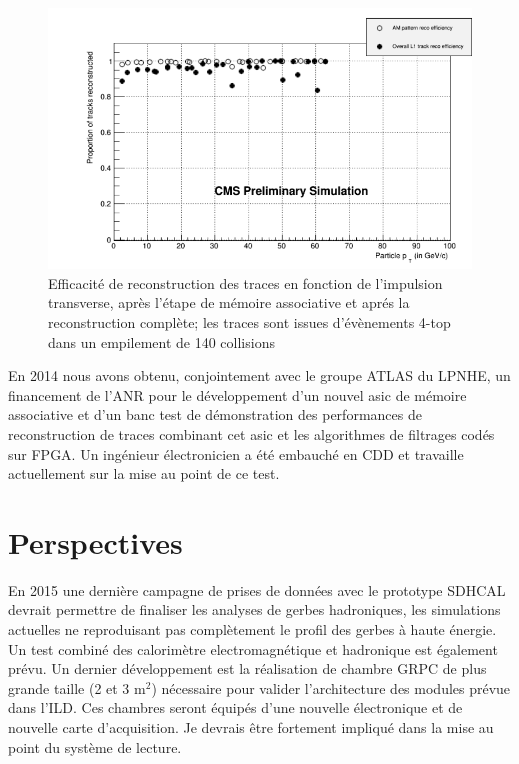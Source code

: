 \documentclass[11pt,french]{article}
\begin{document}
\begin{figure}
\centerline{{\includegraphics[height=0.4\textheight]{./TrackEff.png}}}
\caption{Efficacit\'e de reconstruction des traces en fonction de l'impulsion transverse, apr\`es l'\'etape de m\'emoire associative et apr\'es la reconstruction compl\`ete; les traces sont issues d'\'ev\`enements 4-top dans un empilement de 140 collisions}
\label{track}
\end{figure}


En 2014 nous avons obtenu, conjointement avec le groupe ATLAS du LPNHE, un financement de l'ANR pour le d\'eveloppement d'un nouvel asic de m\'emoire associative et d'un banc test de d\'emonstration des performances de reconstruction de traces combinant cet asic et les algorithmes de filtrages cod\'es sur FPGA. Un ing\'enieur \'electronicien a \'et\'e embauch\'e en CDD et travaille actuellement sur la mise au point de ce test.

\section*{Perspectives}

En 2015 une derni\`ere campagne de prises de donn\'ees avec le prototype SDHCAL devrait permettre de finaliser les analyses de gerbes hadroniques, les simulations actuelles ne reproduisant pas compl\`etement le profil des gerbes \`a haute \'energie. Un test combin\'e des calorim\`etre electromagn\'etique et hadronique est \'egalement pr\'evu. Un dernier d\'eveloppement est la r\'ealisation de chambre GRPC de plus grande taille (2 et 3 m$^2$) n\'ecessaire pour valider l'architecture des modules pr\'evue dans l'ILD. Ces chambres seront \'equip\'es d'une nouvelle \'electronique et de nouvelle carte d'acquisition. Je devrais \^etre fortement impliqu\'e dans la mise au point du syst\`eme de lecture.
\end{document}
